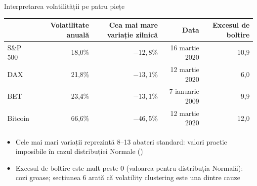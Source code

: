 \begin{frame}{Interpretarea volatilității pe patru piețe}
\itemsize{\footnotesize}
\begin{center}
\footnotesize
\begin{tabular}{lrrrr}
\toprule
& \textbf{Volatilitate anuală} & \textbf{Cea mai mare variație zilnică} & \textbf{Data} & \textbf{Excesul de boltire} \\
\midrule
S\&P 500 & 18{,}0\% & ${-12{,}8}\%$ & 16 martie 2020 & 10{,}9 \\
DAX & 21{,}8\% & ${-13{,}1}\%$ & 12 martie 2020 & 6{,}0 \\
BET & 23{,}4\% & ${-13{,}1}\%$ & 7 ianuarie 2009 & 9{,}9 \\
Bitcoin & 66{,}6\% & ${-46{,}5}\%$ & 12 martie 2020 & 12{,}0 \\
\bottomrule
\end{tabular}
\end{center}
\begin{itemize}
    \item Cele mai mari variații reprezintă 8--13 abateri standard: valori practic imposibile în cazul distribuției Normale ()
    \item Excesul de boltire este mult peste 0 (valoarea pentru distribuția Normală): cozi groase; secțiunea 6 arată că volatility clustering este una dintre cauze
\end{itemize}
\end{frame}

